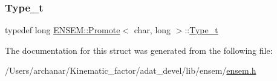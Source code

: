 \subsubsection{\texorpdfstring{Type\_t}{Type\_t}\hspace{0.1cm}{\footnotesize\ttfamily [2/2]}}
{\footnotesize\ttfamily typedef long \mbox{\hyperlink{structENSEM_1_1Promote}{E\+N\+S\+E\+M\+::\+Promote}}$<$ char, long $>$\+::\mbox{\hyperlink{structENSEM_1_1Promote_3_01char_00_01long_01_4_af2c2227ccd58ab5b06ad3e9b368ec6d3}{Type\+\_\+t}}}



The documentation for this struct was generated from the following file\+:\begin{DoxyCompactItemize}
\item 
/\+Users/archanar/\+Kinematic\+\_\+factor/adat\+\_\+devel/lib/ensem/\mbox{\hyperlink{lib_2ensem_2ensem_8h}{ensem.\+h}}\end{DoxyCompactItemize}
